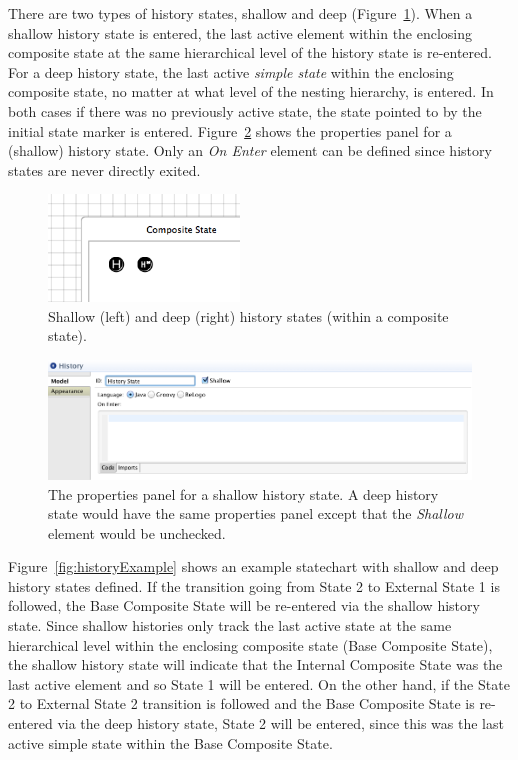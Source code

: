 \documentclass[11pt]{amsart}
\begin{document}
There are two types of history states, shallow and deep (Figure~\ref{fig:history}). When a shallow history state is entered, the last active element within the enclosing composite state at the same hierarchical level of the history state is re-entered. For a deep history state, the last active \emph{simple state} within the enclosing composite state, no matter at what level of the nesting hierarchy, is entered. In both cases if there was no previously active state, the state pointed to by the initial state marker is entered. Figure~\ref{fig:historyProperties} shows the properties panel for a (shallow) history state. Only an \emph{On Enter} element can be defined since history states are never directly exited.


\begin{figure}
\begin{center}
\vspace{.2in}
\centerline {
\includegraphics[width=2in]{StatechartsImages/History.png}
}
\caption{Shallow (left) and deep (right) history states (within a composite state).}
\label{fig:history}
\end{center}
\end{figure}

\begin{figure}
\begin{center}
\vspace{.2in}
\centerline {
\includegraphics[width=5in]{StatechartsImages/HistoryProperties.png}
}
\caption{The properties panel for a shallow history state. A deep history state would have the same properties panel except that the \emph{Shallow} element would be unchecked.}
\label{fig:historyProperties}
\end{center}
\end{figure}

Figure~\ref{fig:historyExample} shows an example statechart with shallow and deep history states defined. If the transition going from State 2 to External State 1 is followed, the Base Composite State will be re-entered via the shallow history state. Since shallow histories only track the last active state at the same hierarchical level within the enclosing composite state (Base Composite State), the shallow history state will indicate that the Internal Composite State was the last active element and so State 1 will be entered. On the other hand, if the State 2 to External State 2 transition is followed and the Base Composite State is re-entered via the deep history state, State 2 will be entered, since this was the last active simple state within the Base Composite State.
\end{document}
